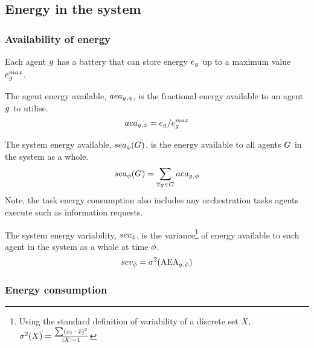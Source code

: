 \subsection{Energy in the system}

\subsubsection{Availability of energy}

Each agent $g_{}^{}$ has a battery that can store energy $\varBatteryEnergy{}{}$ up to a maximum value $\varBatteryEnergyMax{}{}$.

\begin{definition}
	The agent energy available, $aea_{g_{}^{},\phi}$, is the fractional energy available to an agent $g_{}^{}$ to utilise.
	\begin{equation}
		\varAgentEnergyAvailable{}{} = \varBatteryEnergy{}{} / \varBatteryEnergyMax{}{}
	\end{equation}
\end{definition}

\begin{definition}
	The system energy available, $\functionSystemEnergyAvailable{}{}$, is the energy available to all agents $G_{}^{}$ in the system as a whole.
	\begin{equation}
		\functionSystemEnergyAvailable{}{} 
		= \sum_{\forall \varAgent{}{} \in \setAgents{}{}} \varAgentEnergyAvailable{\varAgent{i}{}}{}
	\end{equation}
	Note, the task energy consumption also includes any orchestration tasks agents execute such as information requests.
\end{definition}

\begin{definition}
	The system energy variability, $sev_{\phi}$, is the variance\footnote{Using the standard definition of variability of a discrete set $X$, $\sigma^2(X) = \frac{\sum (x_i - \bar{x})^2}{\lvert X \rvert-1}$} of energy available to each agent in the system as a whole at time $\phi$.
	\begin{equation}
		sev_{\phi} 
		= \sigma^2(\mathrm{AEA}_{g_{}^{},\phi})
	\end{equation}
\end{definition}

\subsubsection{Energy consumption}

